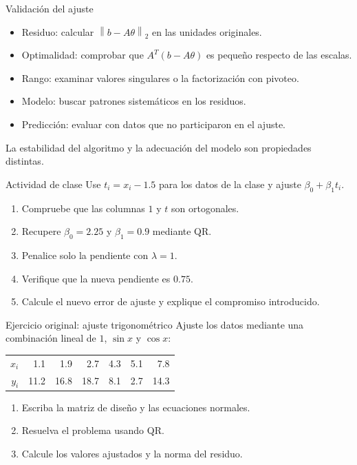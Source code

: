 \documentclass[aspectratio=169,12pt]{beamer}
\newcommand{\norm}[1]{\left\lVert#1\right\rVert}
\begin{document}
\begin{frame}{Validación del ajuste}
\begin{itemize}
\item Residuo: calcular $\norm{b-A\theta}_2$ en las unidades originales.
\item Optimalidad: comprobar que $A^T(b-A\theta)$ es pequeño respecto de las escalas.
\item Rango: examinar valores singulares o la factorización con pivoteo.
\item Modelo: buscar patrones sistemáticos en los residuos.
\item Predicción: evaluar con datos que no participaron en el ajuste.
\end{itemize}
La estabilidad del algoritmo y la adecuación del modelo son propiedades distintas.
\end{frame}

\begin{frame}{Actividad de clase}
Use $t_i=x_i-1.5$ para los datos de la clase y ajuste
$\beta_0+\beta_1t_i$.
\begin{enumerate}
\item Compruebe que las columnas $1$ y $t$ son ortogonales.
\item Recupere $\beta_0=2.25$ y $\beta_1=0.9$ mediante QR.
\item Penalice solo la pendiente con $\lambda=1$.
\item Verifique que la nueva pendiente es $0.75$.
\item Calcule el nuevo error de ajuste y explique el compromiso introducido.
\end{enumerate}
\end{frame}

\begin{frame}{Ejercicio original: ajuste trigonométrico}
Ajuste los datos mediante una combinación lineal de $1$, $\sin x$ y $\cos x$:
\begin{center}\begin{tabular}{rrrrrrr}\toprule
$x_i$ & 1.1 & 1.9 & 2.7 & 4.3 & 5.1 & 7.8\\
$y_i$ & 11.2 & 16.8 & 18.7 & 8.1 & 2.7 & 14.3\\\bottomrule
\end{tabular}\end{center}
\begin{enumerate}
\item Escriba la matriz de diseño y las ecuaciones normales.
\item Resuelva el problema usando QR.
\item Calcule los valores ajustados y la norma del residuo.
\end{enumerate}
\end{frame}
\end{document}

